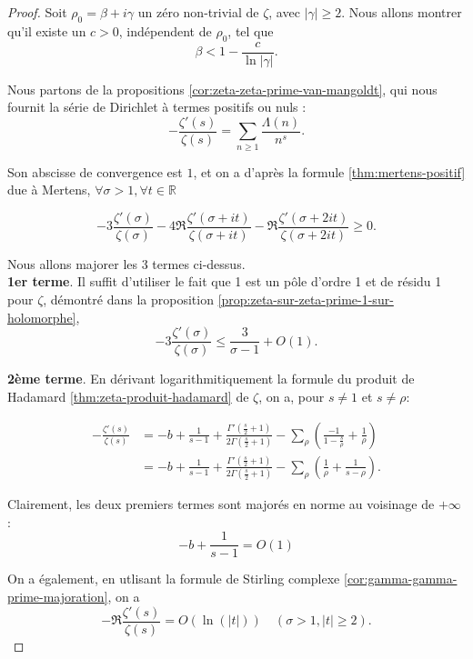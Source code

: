 \documentclass[french]{report}
\begin{document}
\begin{proof}
  Soit $\rho_0=\beta+i\gamma$ un zéro non-trivial de $\zeta$, avec $|\gamma|\geq2$. Nous allons montrer qu'il existe un $c>0$, indépendent de $\rho_0$, tel que 
  \[ \beta<1-\frac{c}{\ln|\gamma|}. \]

  Nous partons de la propositions \ref{cor:zeta-zeta-prime-van-mangoldt}, qui nous fournit la série de Dirichlet à termes positifs ou nuls :
  \[ -\frac{\zeta'(s)}{\zeta(s)} = \sum_{n\geq1}\frac{\Lambda(n)}{n^s}. \]

  Son abscisse de convergence est $1$, et on a d'après la formule \ref{thm:mertens-positif} due à Mertens, $\forall\sigma>1, \forall t\in\mathbb{R}$

 \begin{equation}\label{eq:mertens-zeta-zeta-prime}
  - 3\frac{\zeta'(\sigma)}{\zeta(\sigma)}
  - 4\Re\frac{\zeta'(\sigma+it)}{\zeta(\sigma+it)}
  - \Re\frac{\zeta'(\sigma+2it)}{\zeta(\sigma+2it)}
  \geq0.
 \end{equation}

  Nous allons majorer les 3 termes ci-dessus.
  \\

  \textbf{1er terme}. Il suffit d'utiliser le fait que 1 est un pôle d'ordre 1 et de résidu 1 pour $\zeta$, démontré dans la  proposition \ref{prop:zeta-sur-zeta-prime-1-sur-holomorphe},
  \[ -3\frac{\zeta'(\sigma)}{\zeta(\sigma)} \leq \frac{3}{\sigma-1} + O(1). \]

  \textbf{2ème terme}. En dérivant logarithmitiquement la formule du produit de Hadamard \ref{thm:zeta-produit-hadamard} de $\zeta$, on a, pour $s\neq1$ et $s\neq\rho$:

  \begin{align}
    -\frac{\zeta'(s)}{\zeta(s)}
    &= -b + \frac{1}{s-1}
    + \frac{\Gamma'(\frac{s}{2}+1)}{2\Gamma(\frac{s}{2}+1)}
    - \sum_{\rho}\left(\frac{-1}{1-\frac{s}{\rho}} + \frac{1}{\rho}\right) \\
    &= -b + \frac{1}{s-1}
    + \frac{\Gamma'(\frac{s}{2}+1)}{2\Gamma(\frac{s}{2}+1)}
    - \sum_{\rho}\left(\frac{1}{\rho} + \frac{1}{s-\rho} \right). \label{eq:hadamard-derivee-logarithmique}
  \end{align}

  Clairement, les deux premiers termes sont majorés en norme au voisinage de $+\infty$ :
  \[ -b + \frac{1}{s-1} = O(1) \]

  On a également, en utlisant la formule de Stirling complexe \ref{cor:gamma-gamma-prime-majoration}, on a
  \[ -\Re\frac{\zeta'(s)}{\zeta(s)} = O(\ln(|t|))\quad(\sigma>1, |t|\geq2). \]


\end{proof}
\end{document}
